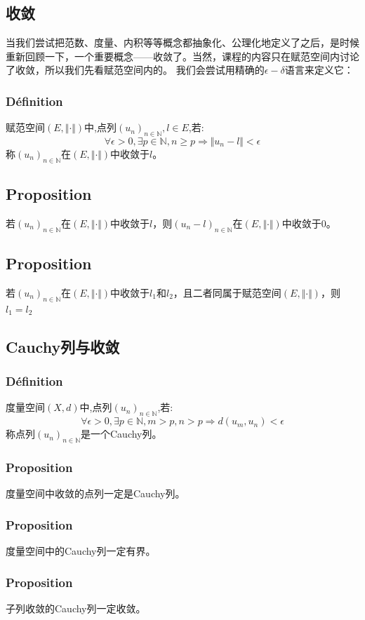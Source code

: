 \documentclass[12pt, a4paper, oneside]{ctexbook}
\begin{document}
  \subsection{收敛}
  当我们尝试把范数、度量、内积等等概念都抽象化、公理化地定义了之后，是时候重新回顾一下，一个重要概念——收敛了。当然，课程的内容只在赋范空间内讨论了收敛，所以我们先看赋范空间内的。
  我们会尝试用精确的$\epsilon-\delta$语言来定义它：
  \subsubsection{Définition}
  赋范空间$(E,\Vert \cdot \Vert)$中,点列$(u_n)_{n\in\mathbb{N}},l\in E$,若:
  $$
    \forall\epsilon>0, \exists p\in \mathbb{N}, n\ge p\Rightarrow \Vert u_n-l \Vert<\epsilon
  $$
  称$(u_n)_{n\in\mathbb{N}}$在$(E,\Vert \cdot \Vert)$中收敛于$l$。
  \subsection{Proposition}
  若$(u_n)_{n\in\mathbb{N}}$在$(E,\Vert \cdot \Vert)$中收敛于$l$，则$(u_n-l)_{n\in\mathbb{N}}$在$(E,\Vert \cdot \Vert)$中收敛于$0$。
  \subsection{Proposition}
  若$(u_n)_{n\in\mathbb{N}}$在$(E,\Vert \cdot \Vert)$中收敛于$l_1$和$l_2$，且二者同属于赋范空间$(E,\Vert \cdot \Vert)$，则$l_1=l_2$
  
  
  \subsection{Cauchy列与收敛}
  \subsubsection{Définition}
  度量空间$(X,d)$中,点列$(u_n)_{n\in\mathbb{N}}$,若:
  $$
    \forall\epsilon>0, \exists p\in \mathbb{N}, m>p,n>p\Rightarrow d(u_m,u_n)<\epsilon
  $$
  称点列$(u_n)_{n\in\mathbb{N}}$是一个Cauchy列。
  \subsubsection{Proposition}
  度量空间中收敛的点列一定是Cauchy列。
  \subsubsection{Proposition}
  度量空间中的Cauchy列一定有界。
  \subsubsection{Proposition}
  子列收敛的Cauchy列一定收敛。
\end{document}
